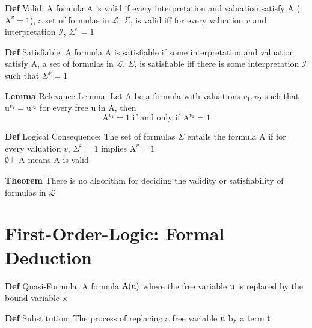 \documentclass[11pt,notitlepage]{report}
\newcommand{\mc}[1]{\ensuremath{\mathcal{#1}}}
\newcommand{\mr}[1]{\ensuremath{\mathrm{#1}}}
\newcommand{\tbf}[1]{\textbf{#1}}
\begin{document}
\tbf{Def} Valid: A formula $\mr A$ is valid if every interpretation and valuation satisfy $\mr A$ ($\mr A^v = 1$), a set of formulas in $\mc L$, $\Sigma$, is valid iff for every valuation $v$ and interpretation $\mc I$, $\Sigma^v = 1$

\tbf{Def} Satisfiable: A formula $\mr A$ is satisfiable if some interpretation and valuation satisfy $\mr A$, a set of formulas in $\mc L$, $\Sigma$, is satisfiable iff there is some interpretation $\mc I$ such that $\Sigma^v = 1$

\tbf{Lemma} Relevance Lemma: Let $\mr A$ be a formula with valuations $v_1, v_2$ such that $\mr u^{v_1} = \mr u^{v_2}$ for every free $\mr u$ in $\mr A$, then
$$\mr A^{v_1} = 1 \text{ if and only if }\mr A^{v_2} = 1$$

\tbf{Def} Logical Consequence: The set of formulas $\Sigma$ entails the formula $\mr A$ if for every valuation $v$, $\Sigma^v = 1$ implies $\mr A^v = 1$\\
\hspace*{5mm} $\emptyset \vDash \mr A$ means $\mr A$ is valid

\tbf{Theorem} There is no algorithm for deciding the validity or satisfiability of formulas in $\mc L$
\vspace{-10mm}
\setcounter{section}{13}
\section{First-Order-Logic: Formal Deduction}
\vspace{-3mm}
\tbf{Def} Quasi-Formula: A formula $\rm A(u)$ where the free variable $\rm u$ is replaced by the bound variable $\rm x$

\tbf{Def} Substitution: The process of replacing a free variable $\rm u$ by a term $\rm t$
\end{document}

